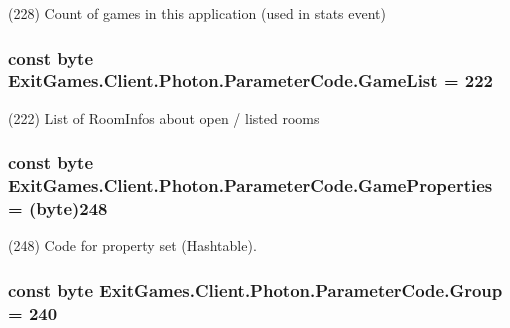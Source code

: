 (228) Count of games in this application (used in stats event)

\subsubsection[{\texorpdfstring{Game\+List}{GameList}}]{\setlength{\rightskip}{0pt plus 5cm}const byte Exit\+Games.\+Client.\+Photon.\+Parameter\+Code.\+Game\+List = 222}\hypertarget{class_exit_games_1_1_client_1_1_photon_1_1_parameter_code_a901f1fba81f5c3613cd88ffb8c8ca4c1}{}\label{class_exit_games_1_1_client_1_1_photon_1_1_parameter_code_a901f1fba81f5c3613cd88ffb8c8ca4c1}


(222) List of Room\+Infos about open / listed rooms

\subsubsection[{\texorpdfstring{Game\+Properties}{GameProperties}}]{\setlength{\rightskip}{0pt plus 5cm}const byte Exit\+Games.\+Client.\+Photon.\+Parameter\+Code.\+Game\+Properties = (byte)248}\hypertarget{class_exit_games_1_1_client_1_1_photon_1_1_parameter_code_a0637f72ee1fd11dfd90022bf7c758720}{}\label{class_exit_games_1_1_client_1_1_photon_1_1_parameter_code_a0637f72ee1fd11dfd90022bf7c758720}


(248) Code for property set (Hashtable).

\subsubsection[{\texorpdfstring{Group}{Group}}]{\setlength{\rightskip}{0pt plus 5cm}const byte Exit\+Games.\+Client.\+Photon.\+Parameter\+Code.\+Group = 240}\hypertarget{class_exit_games_1_1_client_1_1_photon_1_1_parameter_code_a008a132b4295de442fa7fe27eac3e2b9}{}\label{class_exit_games_1_1_client_1_1_photon_1_1_parameter_code_a008a132b4295de442fa7fe27eac3e2b9}


